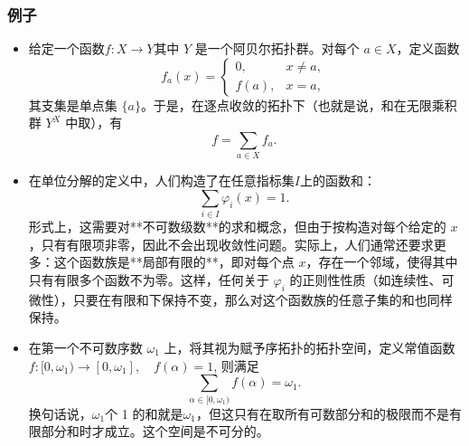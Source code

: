 \subsubsection{例子}
\begin{itemize}
\item 给定一个函数$f: X \to Y$其中 $Y$ 是一个阿贝尔拓扑群。对每个 $a \in X$，定义函数
$$
f_{a}(x) =
\begin{cases}
0, & x \neq a, \\
f(a), & x = a,
\end{cases}~
$$
其支集是单点集 $\{a\}$。于是，在逐点收敛的拓扑下（也就是说，和在无限乘积群 $Y^{X}$ 中取），有
$$
f = \sum_{a \in X} f_{a}.~
$$
\item 在单位分解的定义中，人们构造了在任意指标集$I$上的函数和：
$$
\sum_{i \in I} \varphi_{i}(x) = 1.~
$$
形式上，这需要对**不可数级数**的求和概念，但由于按构造对每个给定的 $x$，只有有限项非零，因此不会出现收敛性问题。实际上，人们通常还要求更多：这个函数族是**局部有限的**，即对每个点 $x$，存在一个邻域，使得其中只有有限多个函数不为零。这样，任何关于 $\varphi_{i}$ 的正则性性质（如连续性、可微性），只要在有限和下保持不变，那么对这个函数族的任意子集的和也同样保持。
\item 在第一个不可数序数 $\omega_{1}$ 上，将其视为赋予序拓扑的拓扑空间，定义常值函数$f: [0, \omega_{1}) \to [0, \omega_{1}], \quad f(\alpha) = 1$,
则满足
$$
\sum_{\alpha \in [0, \omega_{1})} f(\alpha) = \omega_{1}.~
$$
换句话说，$\omega_{1}$个 1 的和就是$\omega_{1}$，但这只有在取所有可数部分和的极限而不是有限部分和时才成立。这个空间是不可分的。
\end{itemize}
